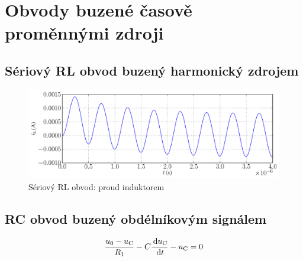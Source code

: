 \section{Obvody buzené časově proměnnými zdroji}

\subsection{Sériový RL obvod buzený harmonický zdrojem}

\begin{figure}[h!]
\centering
\includegraphics[width=13cm]{prechodne_jevy/specialni/obvod_rl_harmonicky_proud.pdf}
\caption{Sériový RL obvod: proud induktorem}
\label{fig:obvod_rl_proud}
\end{figure}

\subsection{RC obvod buzený obdélníkovým signálem}

$$
\frac{u_0 - u_\mathrm{C}}{R_1} - C \frac{\,\mathrm{d} u_\mathrm{C}}{\,\mathrm{d} t} - u_\mathrm{C} = 0
$$

